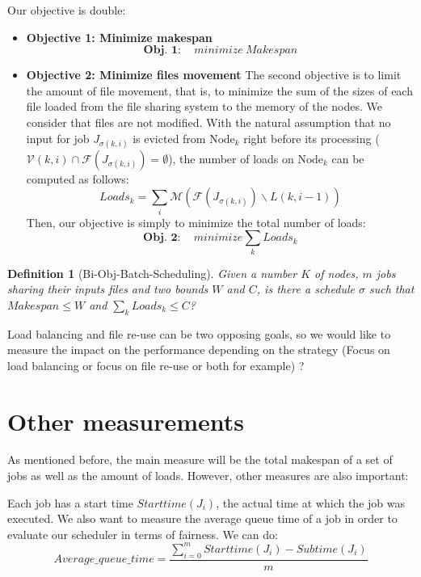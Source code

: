 \documentclass[a4paper]{article}
\newtheorem{definition}{Definition}
\newcommand{\Node}[1]{\ensuremath{\mathrm{Node}_{#1}}\xspace}
\newcommand{\inputs}{\ensuremath{\mathcal{F}}\xspace}
\newcommand{\memory}{\ensuremath{\mathcal{M}}\xspace}
\newcommand{\submissiontime}{\mathit{Subtime}\xspace}
\newcommand{\start}{\mathit{Starttime}\xspace}
\newcommand{\evict}{\ensuremath{\mathcal{V}}\xspace}
\newcommand{\nbloads}{\ensuremath{\mathit{\mathit{Loads}}}\xspace}
\newcommand{\live}{\ensuremath{L}\xspace}
\begin{document}
Our objective is double:
\begin{itemize}
	\item \textbf{Objective 1: Minimize makespan}
		$$
			\textbf{Obj. 1}: \quad \mathit{minimize}~\mathit{Makespan}
		$$
	\item \textbf{Objective 2: Minimize files movement} 
		The second objective is to limit
	    the amount of file movement, that is, to minimize the sum of the sizes of
	    each file loaded from the file sharing system to the memory of the
	    nodes. We consider that files are not modified. With the
	    natural assumption that no input for job $J_{\sigma(k,i)}$ is
	    evicted from $\Node{k}$ right before its processing
	    ($\evict(k,i) \cap \inputs(J_{\sigma(k,i)}) = \emptyset$), the
	    number of loads on $\Node{k}$ can be computed as follows:
		$$
			\nbloads_k =\sum_i \memory(\inputs\left(J_{\sigma(k,i)}\right) \backslash \live(k,i-1))
		$$
		Then, our objective is simply to minimize the total number of loads:
		$$
			\textbf{Obj. 2}: \quad  \mathit{minimize} \sum_k \nbloads_k
		$$
\end{itemize}

\begin{definition}[Bi-Obj-Batch-Scheduling]
  Given a number $K$ of nodes, $m$ jobs sharing their inputs files
  and two bounds $W$ and $C$, is there a
  schedule $\sigma$ %
  such that $\mathit{Makespan} \leq W$ and $\sum_k \nbloads_k \leq C$?
\end{definition}

Load balancing and file re-use can be two opposing goals, so we would like to measure the impact on the performance depending on the strategy (Focus on load balancing or focus on file re-use or both for example) ?

\section{Other measurements}

As mentioned before, the main measure will be the total makespan of a set of jobs as well as the amount of loads.
However, other measures are also important:

Each job has a start time $\start(J_i)$, the actual time at which the job was executed.
We also want to measure the average queue time of a job in order
to evaluate our scheduler in terms of fairness. We can do:
$$
	Average\_queue\_time = \frac{\sum^{m}_{i = 0} \start(J_i) - \submissiontime(J_i)}{m}
$$
\end{document}
